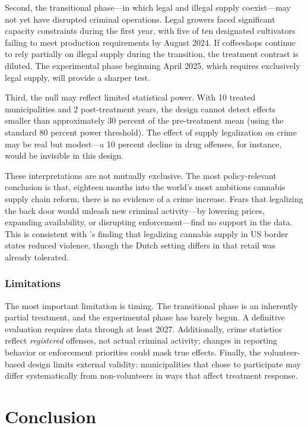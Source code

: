 \documentclass[12pt]{article}
\begin{document}
Second, the transitional phase---in which legal and illegal supply coexist---may not yet have disrupted criminal operations. Legal growers faced significant capacity constraints during the first year, with five of ten designated cultivators failing to meet production requirements by August 2024. If coffeeshops continue to rely partially on illegal supply during the transition, the treatment contrast is diluted. The experimental phase beginning April 2025, which requires exclusively legal supply, will provide a sharper test.

Third, the null may reflect limited statistical power. With 10 treated municipalities and 2 post-treatment years, the design cannot detect effects smaller than approximately 30 percent of the pre-treatment mean (using the standard 80 percent power threshold). The effect of supply legalization on crime may be real but modest---a 10 percent decline in drug offenses, for instance, would be invisible in this design.

These interpretations are not mutually exclusive. The most policy-relevant conclusion is that, eighteen months into the world's most ambitious cannabis supply chain reform, there is no evidence of a crime increase. Fears that legalizing the back door would unleash new criminal activity---by lowering prices, expanding availability, or disrupting enforcement---find no support in the data. This is consistent with \citet{gavrilova2019legal}'s finding that legalizing cannabis supply in US border states reduced violence, though the Dutch setting differs in that retail was already tolerated.

\subsubsection*{Limitations} The most important limitation is timing. The transitional phase is an inherently partial treatment, and the experimental phase has barely begun. A definitive evaluation requires data through at least 2027. Additionally, crime statistics reflect \textit{registered} offenses, not actual criminal activity; changes in reporting behavior or enforcement priorities could mask true effects. Finally, the volunteer-based design limits external validity: municipalities that chose to participate may differ systematically from non-volunteers in ways that affect treatment response.


\section{Conclusion}
\end{document}

